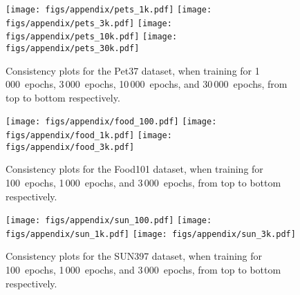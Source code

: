 \documentclass[10pt,twocolumn,letterpaper]{article}
\begin{document}
\begin{figure*}[ht]\centering
\texttt{[image: figs/appendix/pets\_1k.pdf]}
    \texttt{[image: figs/appendix/pets\_3k.pdf]}
    \texttt{[image: figs/appendix/pets\_10k.pdf]}
    \texttt{[image: figs/appendix/pets\_30k.pdf]}
\caption{Consistency plots for the Pet37 dataset, when training for 1\,000~epochs, 3\,000~epochs, 10\,000~epochs, and 30\,000~epochs, from top to bottom respectively.}\label{fig:app:consistency_pets}\end{figure*}

\begin{figure*}[ht]\centering
    \texttt{[image: figs/appendix/food\_100.pdf]}
    \texttt{[image: figs/appendix/food\_1k.pdf]}
    \texttt{[image: figs/appendix/food\_3k.pdf]}
\caption{Consistency plots for the Food101 dataset, when training for 100~epochs, 1\,000~epochs, and 3\,000~epochs, from top to bottom respectively.}\label{fig:app:consistency_food}\end{figure*}

\begin{figure*}[ht]\centering
    \texttt{[image: figs/appendix/sun\_100.pdf]}
    \texttt{[image: figs/appendix/sun\_1k.pdf]}
    \texttt{[image: figs/appendix/sun\_3k.pdf]}
\caption{Consistency plots for the SUN397 dataset, when training for 100~epochs, 1\,000~epochs, and 3\,000~epochs, from top to bottom respectively.}\label{fig:app:consistency_sun}\end{figure*}
 
\end{document}
